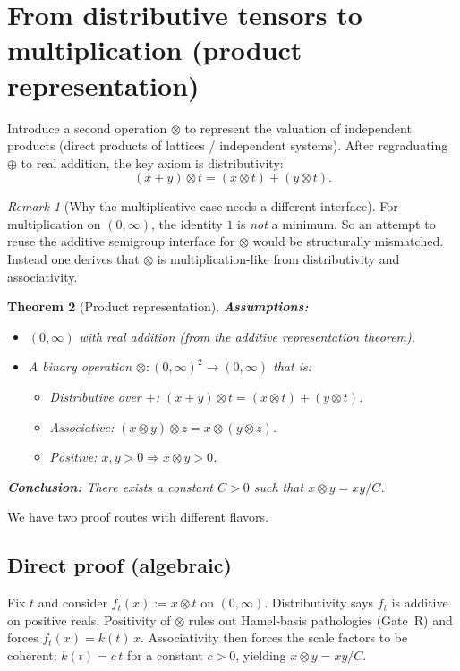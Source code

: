 \documentclass[11pt]{article}
\newtheorem{theorem}{Theorem}[section]
\theoremstyle{definition}
\theoremstyle{remark}
\newtheorem{remark}[theorem]{Remark}
\begin{document}
\newpage
\section{From distributive tensors to multiplication (product representation)}
\label{sec:product_rep}

Introduce a second operation $\otimes$ to represent the valuation of independent products
(direct products of lattices / independent systems). After regraduating $\oplus$ to real addition,
the key axiom is distributivity:
\[
(x+y)\otimes t = (x\otimes t) + (y\otimes t).
\]

\begin{remark}[Why the multiplicative case needs a different interface]
For multiplication on $(0,\infty)$, the identity $1$ is \emph{not} a minimum.  So an attempt to reuse the
additive semigroup interface for $\otimes$ would be structurally mismatched.
Instead one derives that $\otimes$ is multiplication-like from distributivity and associativity.
\end{remark}

\begin{theorem}[Product representation]
\textbf{Assumptions:}
\begin{itemize}
\item $(0,\infty)$ with real addition (from the additive representation theorem).
\item A binary operation $\otimes : (0,\infty)^2 \to (0,\infty)$ that is:
  \begin{itemize}
  \item Distributive over $+$: $(x+y)\otimes t = (x\otimes t)+(y\otimes t)$.
  \item Associative: $(x\otimes y)\otimes z = x\otimes(y\otimes z)$.
  \item Positive: $x,y>0 \Rightarrow x\otimes y > 0$.
  \end{itemize}
\end{itemize}
\textbf{Conclusion:}
There exists a constant $C>0$ such that $x\otimes y = xy/C$.
\end{theorem}

We have two proof routes with different flavors.

\subsection{Direct proof (algebraic)}

Fix $t$ and consider $f_t(x) := x\otimes t$ on $(0,\infty)$.
Distributivity says $f_t$ is additive on positive reals.  Positivity of $\otimes$ rules out
Hamel-basis pathologies (Gate~R) and forces $f_t(x)=k(t)\,x$.
Associativity then forces the scale factors to be coherent: $k(t)=c\,t$ for a constant $c>0$,
yielding $x\otimes y = xy/C$.
\end{document}
